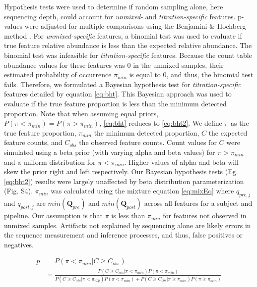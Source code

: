 \documentclass[linenumbers]{bmcart}
\begin{document}
Hypothesis tests were used to determine if random sampling alone, here sequencing depth, could account for \emph{unmixed-} and \emph{titration-specific} features.
p-values were adjusted for multiple comparisons using the Benjamini \& Hochberg method \cite{benjamini1995controlling}.
For \emph{unmixed-specific} features, a binomial test was used to evaluate if true feature relative abundance is less than the expected relative abundance.
The binomial test was infeasible for \emph{titration-specific} features.
Because the count table abundance values for these features was 0 in the unmixed samples,
their estimated probability of occurrence $\pi_{min}$ is equal to 0,
and thus, the binomial test fails.
Therefore, we formulated a Bayesian hypothesis test for \emph{titration-specific} features detailed by equation \eqref{eq:bht}.
This Bayesian approach was used to  evaluate if the true feature proportion is less than the minimum detected proportion.
Note that when assuming equal priors, $P(\pi < \pi_{min}) = P(\pi > \pi_{min})$,
\eqref{eq:bht} reduces to \eqref{eq:bht2}.
We define $\pi$ as the true feature proportion, $\pi_{min}$ the minimum detected proportion,
$C$ the expected feature counts, and $C_{obs}$ the observed feature counts.
Count values for $C$ were simulated using a beta prior (with varying alpha and beta values) for $\pi > \pi_{min}$ and a uniform distribution for $\pi < \pi_{min}$.
Higher values of alpha and beta will skew the prior right and left respectively. Our Bayesian hypothesis tests (Eg. \eqref{eq:bht2}) results were largely unaffected by beta distribution parameterization (Fig. S4).
$\pi_{min}$ was calculated using the mixture equation \eqref{eq:mixEq} where $q_{pre,j}$ and $q_{post,j}$ are $min(\textbf{Q}_{pre})$ and $min(\textbf{Q}_{post})$ across all features for a subject and pipeline.
Our assumption is that $\pi$ is less than $\pi_{min}$ for features not observed in unmixed samples.
Artifacts not explained by sequencing alone are likely errors in the sequence measurement and inference processes, and thus, false positives or negatives.


\begin{equation}
  \begin{split}
    p & = P(\pi < \pi_{min} | C \geq C_{obs}) \\
      & = \frac{P(C \geq C_{obs}| \pi < \pi_{min})P(\pi < \pi_{min})}{P(C \geq C_{obs}| \pi < \pi_{exp})P(\pi < \pi_{min}) + P(C \geq C_{obs}| \pi \geq \pi_{min})P(\pi \geq \pi_{min})} \\
  \end{split}
  \label{eq:bht}
\end{equation}
\end{document}
